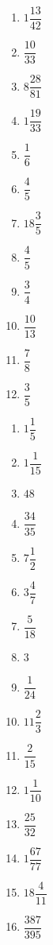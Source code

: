 
\begin{multicols}{4}
\begin{enumerate}[$(1)$]
\item $1\dfrac{13}{42}$ 
\item $\dfrac{10}{33}$
\item $8 \dfrac{28}{81}$
\item $1\dfrac{19}{33}$
\item $\dfrac{1}{6}$ 
\item $\dfrac{4}{5}$
\item $18 \dfrac{3}{5}$
\item $\dfrac{4}{5}$
\item $\dfrac{3}{4}$ 
\item $\dfrac{10}{13}$ 
\item $\dfrac{7}{8}$ 
\item $\dfrac{3}{5}$
\end{enumerate}
\end{multicols}


\begin{multicols}{4}
\begin{enumerate}[$(1)$]
\item $ 1\dfrac{1}{5}$ 
\item $1\dfrac{1}{15}$ 
\item $48$
\item $\dfrac{34}{35}$
\item $7\dfrac{1}{2}$
\item $3\dfrac{4}{7}$ 
\item $\dfrac{5}{18}$
\item $ 3$
\item $\dfrac{1}{24}$ 
\item $11\dfrac{2}{3}$ 
\item $\dfrac{2}{15}$
\item $1\dfrac{1}{10}$
\item $\dfrac{25}{32}$ 
\item $1\dfrac{67}{77}$ 
\item $18\dfrac{4}{11}$ 
\item $\dfrac{387}{395}$   
\end{enumerate}
\end{multicols}


